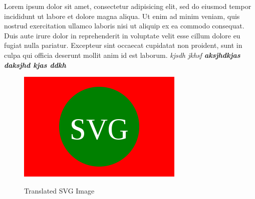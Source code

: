 \documentclass[12pt]{book}\usepackage{graphicx}\usepackage{float}\floatstyle{boxed}\restylefloat{figure}
\begin{document}
Lorem ipsum dolor sit amet, consectetur adipisicing elit, sed do eiusmod tempor
incididunt ut labore et dolore magna aliqua. Ut enim ad minim veniam, quis
nostrud exercitation ullamco laboris nisi ut aliquip ex ea commodo consequat.
Duis aute irure dolor in reprehenderit in voluptate velit esse cillum dolore eu
fugiat nulla pariatur. Excepteur sint occaecat cupidatat non proident, sunt in
culpa qui officia deserunt mollit anim id est laborum. {\it{}kjsdh jkhsf\bf{}
aksjhdkjas daksjhd kjas ddkh}
\begin{figure}[htbp]
\centering{}\setlength \fboxsep{0.5cm}\setlength \fboxrule{0.5pt}\fbox
{\includegraphics[angle=45, scale=0.2]{svg-ex0.png}}\caption{Translated SVG Image}
\end{figure}
\end{document}
